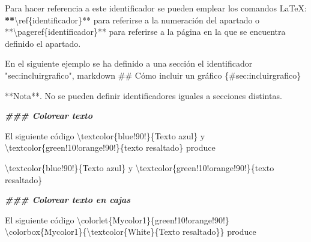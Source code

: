 \documentclass[11pt,a4paper,oneside,]{article}
\newenvironment{Shaded}{\begin{snugshade}}{\end{snugshade}}
\newcommand{\AttributeTok}[1]{\textcolor[rgb]{0.77,0.63,0.00}{#1}}
\newcommand{\DecValTok}[1]{\textcolor[rgb]{0.00,0.00,0.81}{#1}}
\newcommand{\DocumentationTok}[1]{\textcolor[rgb]{0.56,0.35,0.01}{\textbf{\textit{#1}}}}
\newcommand{\ErrorTok}[1]{\textcolor[rgb]{0.64,0.00,0.00}{\textbf{#1}}}
\newcommand{\NormalTok}[1]{#1}
\newcommand{\SpecialCharTok}[1]{\textcolor[rgb]{0.00,0.00,0.00}{#1}}
\newcommand{\StringTok}[1]{\textcolor[rgb]{0.31,0.60,0.02}{#1}}
\numberwithin{dummy}{section}
\theoremstyle{ocrenumbox}
\theoremstyle{blacknumex}
\theoremstyle{blacknumbox}
\theoremstyle{ocrenum}
\theoremstyle{ocrenum}
\begin{document}
\begin{Shaded}
\begin{Highlighting}[numbers=left,,firstnumber=1101,]
\NormalTok{Para hacer referencia a este identificador se pueden emplear los comandos LaTeX}\SpecialCharTok{:} \ErrorTok{**}\StringTok{\textasciigrave{}}\SpecialCharTok{\textbackslash{}r}\AttributeTok{ef\{identificador\}}\StringTok{\textasciigrave{}}\SpecialCharTok{**}\NormalTok{ para referirse a la numeración del apartado o }\SpecialCharTok{**}\StringTok{\textasciigrave{}}\AttributeTok{\textbackslash{}pageref\{identificador\}}\StringTok{\textasciigrave{}}\SpecialCharTok{**}\NormalTok{ para referirse a la página en la que se encuentra definido el apartado.}


\NormalTok{En el siguiente ejemplo se ha definido a una sección el identificador }\StringTok{"sec:incluirgrafico"}\NormalTok{, }
\StringTok{\textasciigrave{}\textasciigrave{}\textasciigrave{}}\AttributeTok{markdown}
\AttributeTok{\#\# Cómo incluir un gráfico \{\#sec:incluirgrafico\}}
\StringTok{\textasciigrave{}\textasciigrave{}\textasciigrave{}}

\SpecialCharTok{**}\NormalTok{Nota}\SpecialCharTok{**}\NormalTok{. No se pueden definir identificadores iguales a secciones distintas.}



\DocumentationTok{\#\#\# Colorear texto}

\NormalTok{El siguiente código}
\StringTok{\textasciigrave{}\textasciigrave{}\textasciigrave{}}
\SpecialCharTok{\textbackslash{}t}\AttributeTok{extcolor\{blue!90!\}\{Texto azul\} y }
\SpecialCharTok{\textbackslash{}t}\AttributeTok{extcolor\{green!10!orange!90!\}\{texto resaltado\}}
\StringTok{\textasciigrave{}\textasciigrave{}\textasciigrave{}}
\NormalTok{produce}

\NormalTok{\textbackslash{}textcolor\{blue}\SpecialCharTok{!}\DecValTok{90}\SpecialCharTok{!}\NormalTok{\}\{Texto azul\} y }
\NormalTok{\textbackslash{}textcolor\{green}\SpecialCharTok{!}\DecValTok{10}\SpecialCharTok{!}\NormalTok{orange}\SpecialCharTok{!}\DecValTok{90}\SpecialCharTok{!}\NormalTok{\}\{texto resaltado\}}



\DocumentationTok{\#\#\# Colorear texto en cajas}

\NormalTok{El siguiente código}
\StringTok{\textasciigrave{}\textasciigrave{}\textasciigrave{}}
\AttributeTok{\textbackslash{}colorlet\{Mycolor1\}\{green!10!orange!90!\}}
\AttributeTok{\textbackslash{}colorbox\{Mycolor1\}\{}\SpecialCharTok{\textbackslash{}t}\AttributeTok{extcolor\{White\}\{Texto resaltado\}\}}
\StringTok{\textasciigrave{}\textasciigrave{}\textasciigrave{}}
\NormalTok{produce}


\end{Highlighting}
\end{Shaded}
\end{document}
